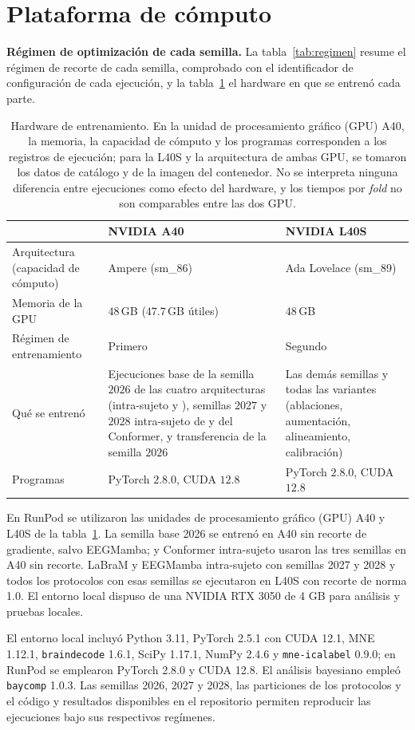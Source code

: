 \section{Plataforma de cómputo}
\textbf{Régimen de optimización de cada semilla.} La tabla~\ref{tab:regimen} resume el
régimen de recorte de cada semilla, comprobado con el identificador de configuración de cada
ejecución, y la tabla~\ref{tab:hardware} el hardware en que se entrenó cada parte.

\begin{table}[H]
\centering
\caption{Hardware de entrenamiento. En la unidad de procesamiento gráfico (GPU) A40, la memoria, la capacidad de cómputo y los programas corresponden a los registros de ejecución; para la L40S y la arquitectura de ambas GPU, se tomaron los datos de catálogo y de la imagen del contenedor. No se interpreta ninguna diferencia entre ejecuciones como efecto del hardware, y los tiempos por \textit{fold} no son comparables entre las dos GPU.}
\label{tab:hardware}
\small
\begin{tabular}{@{}p{3.6cm}p{5.2cm}p{5.2cm}@{}}
\toprule
 & \textbf{NVIDIA A40} & \textbf{NVIDIA L40S} \\
\midrule
Arquitectura (capacidad de cómputo) & Ampere (sm\_86) & Ada Lovelace (sm\_89) \\
Memoria de la GPU                   & $48$\,GB ($47.7$\,GB útiles) & $48$\,GB \\
Régimen de entrenamiento            & Primero & Segundo \\
Qué se entrenó                      & Ejecuciones base de la semilla $2026$ de las cuatro arquitecturas (intra-sujeto y \loso{}), semillas $2027$ y $2028$ intra-sujeto de \eegnet{} y del Conformer, y transferencia de la semilla $2026$ & Las demás semillas y todas las variantes (ablaciones, aumentación, alineamiento, calibración) \\
Programas                           & PyTorch $2.8.0$, CUDA $12.8$ & PyTorch $2.8.0$, CUDA $12.8$ \\
\bottomrule
\end{tabular}
\end{table}

En RunPod se utilizaron las unidades de procesamiento gráfico (GPU) A40 y L40S de la tabla~\ref{tab:hardware}. La
semilla base 2026 se entrenó en A40 sin recorte de gradiente, salvo EEGMamba;
\eegnet{} y Conformer intra-sujeto usaron las tres semillas en A40 sin recorte.
LaBraM y EEGMamba intra-sujeto con semillas 2027 y 2028 y todos los protocolos
\loso{} con esas semillas se ejecutaron en L40S con recorte de norma 1.0. El
entorno local dispuso de una NVIDIA RTX 3050 de 4 GB para análisis y pruebas locales.

El entorno local incluyó Python 3.11, PyTorch 2.5.1 con CUDA 12.1, MNE 1.12.1,
\texttt{braindecode} 1.6.1, SciPy 1.17.1, NumPy 2.4.6 y \texttt{mne-icalabel}
0.9.0; en RunPod se emplearon PyTorch 2.8.0 y CUDA 12.8. El análisis bayesiano
empleó \texttt{baycomp} 1.0.3. Las semillas 2026, 2027 y 2028, las particiones
de los protocolos y el código y resultados disponibles en el repositorio
\cite{ayala2026repo} permiten reproducir las ejecuciones bajo sus respectivos regímenes.
